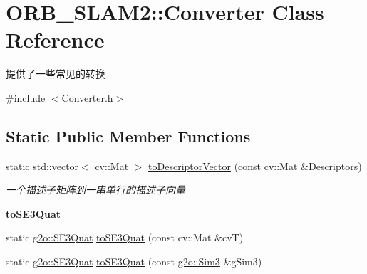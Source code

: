 \hypertarget{class_o_r_b___s_l_a_m2_1_1_converter}{}\section{O\+R\+B\+\_\+\+S\+L\+A\+M2\+:\+:Converter Class Reference}
\label{class_o_r_b___s_l_a_m2_1_1_converter}


提供了一些常见的转换  




{\ttfamily \#include $<$Converter.\+h$>$}

\subsection*{Static Public Member Functions}
\begin{DoxyCompactItemize}
\item 
static std\+::vector$<$ cv\+::\+Mat $>$ \mbox{\hyperlink{class_o_r_b___s_l_a_m2_1_1_converter_abef47701eefdbc74c2c1625c140963fd}{to\+Descriptor\+Vector}} (const cv\+::\+Mat \&Descriptors)
\begin{DoxyCompactList}\small\item\em 一个描述子矩阵到一串单行的描述子向量 \end{DoxyCompactList}\end{DoxyCompactItemize}
\begin{Indent}\textbf{ to\+S\+E3\+Quat}\par
\begin{DoxyCompactItemize}
\item 
static \mbox{\hyperlink{classg2o_1_1_s_e3_quat}{g2o\+::\+S\+E3\+Quat}} \mbox{\hyperlink{class_o_r_b___s_l_a_m2_1_1_converter_a0b73791a3e2d90b4de41aed0ece2d0a2}{to\+S\+E3\+Quat}} (const cv\+::\+Mat \&cvT)
\item 
static \mbox{\hyperlink{classg2o_1_1_s_e3_quat}{g2o\+::\+S\+E3\+Quat}} \mbox{\hyperlink{class_o_r_b___s_l_a_m2_1_1_converter_ac76ddd3b4d9a7e364e5cc72cfe483247}{to\+S\+E3\+Quat}} (const \mbox{\hyperlink{structg2o_1_1_sim3}{g2o\+::\+Sim3}} \&g\+Sim3)
\end{DoxyCompactItemize}
\end{Indent}
